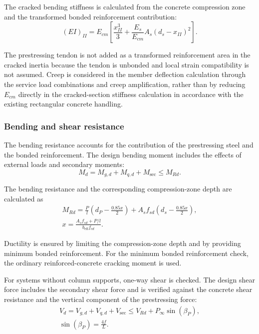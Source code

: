 The cracked bending stiffness is calculated from the concrete compression zone and the transformed bonded reinforcement contribution:
\begin{equation}
(EI)_{II}
=
E_{cm}
\left[
\frac{x_{II}^3}{3}
+
\frac{E_s}{E_{cm}}
A_s
(d_s-x_{II})^2
\right].
\end{equation}

The prestressing tendon is not added as a transformed reinforcement area in the cracked inertia because the tendon is unbonded and local strain compatibility is not assumed. Creep is considered in the member deflection calculation through the service load combinations and creep amplification, rather than by reducing \(E_{cm}\) directly in the cracked-section stiffness calculation in accordance with the existing rectangular concrete handling.

\subsubsection{Bending and shear resistance}

The bending resistance accounts for the contribution of the prestressing steel and the bonded reinforcement. The design bending moment includes the effects of external loads and secondary moments:
\begin{equation}
M_d
=
M_{g,d}
+
M_{q,d}
+
M_{\mathrm{sec}}
\leq
M_{Rd}.
\end{equation}

The bending resistance and the corresponding compression-zone depth are calculated as
\begin{equation}
\begin{gathered}
M_{Rd}
=
\frac{P}{l}
\left(
d_P-\frac{0.85x}{2}
\right)
+
A_s f_{sd}
\left(
d_s-\frac{0.85x}{2}
\right),
\\[0.5em]
x
=
\frac{
A_s f_{sd}
+
P/l
}
{
b_{\mathrm{eff}} f_{cd}
}.
\end{gathered}
\end{equation}

Ductility is ensured by limiting the compression-zone depth and by providing minimum bonded reinforcement. For the minimum bonded reinforcement check, the ordinary reinforced-concrete cracking moment is used.

For systems without column supports, one-way shear is checked. The design shear force includes the secondary shear force and is verified against the concrete shear resistance and the vertical component of the prestressing force:
\begin{equation}
\begin{gathered}
V_d
=
V_{g,d}
+
V_{q,d}
+
V_{\mathrm{sec}}
\leq
V_{Rd}
+
P_{\infty}\sin(\beta_P),\\[0.5em]
\sin(\beta_P)
=
\frac{4f}{L}.
\end{gathered}
\end{equation}

